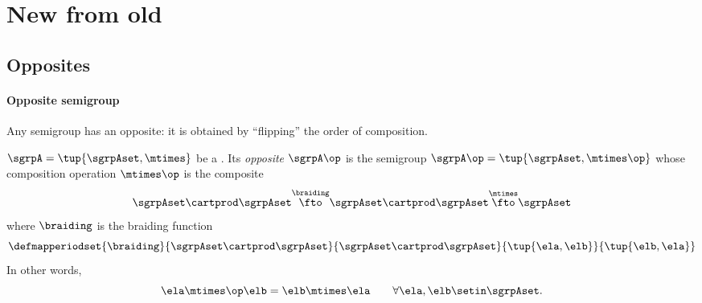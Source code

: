
\section{New from old}
\label{sec:new-from-old}




\subsection{Opposites}


\paragraph{Opposite semigroup}

Any semigroup has an opposite: it is obtained by ``flipping'' the order of composition.


\begin{definition}\label{def:opposite-semigroup}
    $\sgrpA = \tup{\sgrpAset, {{\mtimes}}}$ be a .
    Its \emph{opposite} $\sgrpA\op$ is the semigroup $\sgrpA\op = \tup{\sgrpAset, {{\mtimes \op}}}$ whose composition operation $\mtimes \op$ is the composite
    \begin{equation}
        \sgrpAset \cartprod \sgrpAset \overset{\braiding}{\fto} \sgrpAset \cartprod \sgrpAset \overset{\mtimes}{\fto} \sgrpAset
    \end{equation}
    where $\braiding$ is the braiding function
    \begin{equation}
        \defmapperiodset{
            \braiding
        }{
            \sgrpAset \cartprod \sgrpAset
        }{
            \sgrpAset \cartprod \sgrpAset
        }{
            \tup{\ela, \elb}
        }{
            \tup{\elb, \ela}
        }
    \end{equation}
    In other words,
    \begin{equation}
        \ela \mtimes \op \elb = \elb \mtimes \ela \qquad \forall \ela, \elb \setin \sgrpAset.
    \end{equation}

\end{definition}



